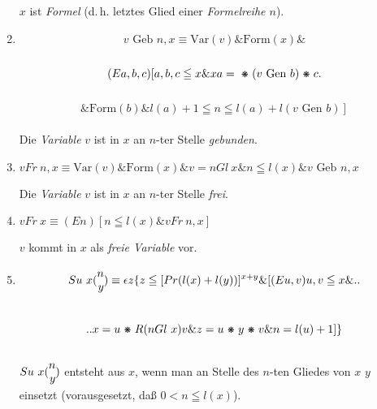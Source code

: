 \documentclass[draft]{scrartcl}
\begin{document}
\begin{enumerate}[1.]
	$x$ ist \textit{Formel} (d.\,h. letztes Glied einer \textit{Formelreihe $n$}).

	\item {}$$
		v \text{ Geb } n, x \equiv \text{Var}\left(v\right) \& \text{Form}\left(x\right) \&
	$$\\[\spacebetweenbreakedequations]
	$$
	\left(Ea, b, c\right) \left[a, b, c \leqq x \& x a = \pmstar \left(v \text{ Gen } b\right) \pmstar c\right.
	$$\\[\spacebetweenbreakedequations]
	$$\left.\& \text{Form}\left(b\right) \& l\left(a\right) + 1 \leqq n \leqq l\left(a\right) + l\left(v \text{ Gen } b\right)\right]
	$$\\[\spaceafterbreakedequation]

	Die \textit{Variable} $v$ ist in $x$ an $n$-ter Stelle \textit{gebunden}.

	\item {}$v Fr\ n, x \equiv \text{Var}\left(v\right) \& \text{Form}\left(x\right) \& v = n Gl\ x \& n \leqq l\left(x\right) \& v \text{ Geb } n, x$

	Die \textit{Variable} $v$ ist in $x$ an $n$-ter Stelle \textit{frei}.

	\item $v Fr\ x \equiv \left(En\right) \left[n \leqq l\left(x\right) \& v Fr\ n, x\right]$%

	$v$ kommt in $x$ als \textit{freie Variable} vor.

	\item $$
		Su\ x \Spvek{n; y} \equiv \epsilon z \left\{ z \leqq \left[Pr\left(l\left(x\right) + l\left(y\right)\right)\right]^{x + y} \& \left[\left(Eu, v\right) u, v \leqq x \& \right.\right.
	$$\\[\spacebetweenbreakedequations]
	$$
		\left.\left.x = u \pmstar R\left(n Gl\ x\right) v \& z = u \pmstar y \pmstar v \& n = l\left(u\right) + 1\right]\right\}
	$$\\[\spacebetweenbreakedequations]

	$Su\ x \Spvek{n; y}$ entsteht aus $x$, wenn man an Stelle des $n$-ten Gliedes von $x$ $y$ einsetzt (vorausgesetzt, daß $0 < n \leqq l\left(x\right)$).


\end{enumerate}
\end{document}
